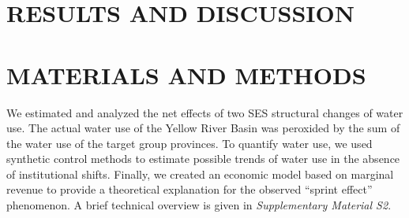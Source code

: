 \documentclass{../nsr}
\begin{document}
\begin{figure}[!ht]
{		%
	}
	\label{structure}
\end{figure}


\section{RESULTS AND DISCUSSION}\label{results}




%
%

%


\section{MATERIALS AND METHODS}

We estimated and analyzed the net effects of two SES structural changes of water use. The actual water use of the Yellow River Basin was peroxided by the sum of the water use of the target group provinces. To quantify water use, we used synthetic control methods to estimate possible trends of water use in the absence of institutional shifts. Finally, we created an economic model based on marginal revenue to provide a theoretical explanation for the observed “sprint effect” phenomenon. A brief technical overview is given in \textit{Supplementary Material S2}.
\end{document}
